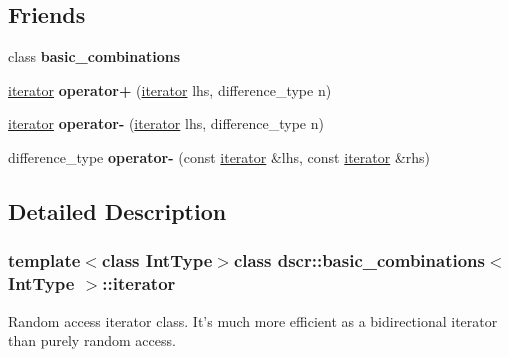 \subsection*{Friends}
\begin{DoxyCompactItemize}
\item 
\hypertarget{classdscr_1_1basic__combinations_1_1iterator_a5aee9caa75ebeddad7d54e7f4931ce21}{class {\bfseries basic\-\_\-combinations}}\label{classdscr_1_1basic__combinations_1_1iterator_a5aee9caa75ebeddad7d54e7f4931ce21}

\item 
\hypertarget{classdscr_1_1basic__combinations_1_1iterator_aac5493422e75e70b321e439c45168fd0}{\hyperlink{classdscr_1_1basic__combinations_1_1iterator}{iterator} {\bfseries operator+} (\hyperlink{classdscr_1_1basic__combinations_1_1iterator}{iterator} lhs, difference\-\_\-type n)}\label{classdscr_1_1basic__combinations_1_1iterator_aac5493422e75e70b321e439c45168fd0}

\item 
\hypertarget{classdscr_1_1basic__combinations_1_1iterator_a87727d9351117b3726fbeac5da5eb28c}{\hyperlink{classdscr_1_1basic__combinations_1_1iterator}{iterator} {\bfseries operator-\/} (\hyperlink{classdscr_1_1basic__combinations_1_1iterator}{iterator} lhs, difference\-\_\-type n)}\label{classdscr_1_1basic__combinations_1_1iterator_a87727d9351117b3726fbeac5da5eb28c}

\item 
\hypertarget{classdscr_1_1basic__combinations_1_1iterator_a4304f5d7bb1d12de2d2ad2c1e4e64dab}{difference\-\_\-type {\bfseries operator-\/} (const \hyperlink{classdscr_1_1basic__combinations_1_1iterator}{iterator} \&lhs, const \hyperlink{classdscr_1_1basic__combinations_1_1iterator}{iterator} \&rhs)}\label{classdscr_1_1basic__combinations_1_1iterator_a4304f5d7bb1d12de2d2ad2c1e4e64dab}

\end{DoxyCompactItemize}


\subsection{Detailed Description}
\subsubsection*{template$<$class Int\-Type$>$class dscr\-::basic\-\_\-combinations$<$ Int\-Type $>$\-::iterator}

Random access iterator class. It's much more efficient as a bidirectional iterator than purely random access. 

